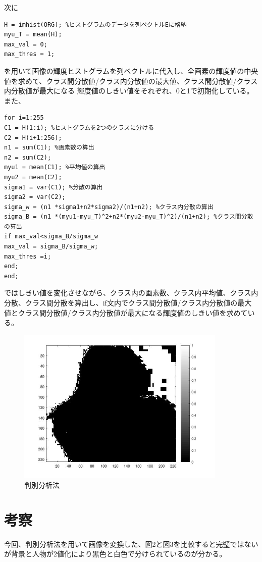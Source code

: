\documentclass{jsarticle}
\begin{document}
次に
\begin{lstlisting}[basicstyle=\ttfamily\footnotesize, frame=single]
H = imhist(ORG); %ヒストグラムのデータを列ベクトルEに格納
myu_T = mean(H);
max_val = 0;
max_thres = 1;
 \end{lstlisting}
を用いて画像の輝度ヒストグラムを列ベクトルに代入し、全画素の輝度値の中央値を求めて、クラス間分散値/クラス内分散値の最大値、クラス間分散値/クラス内分散値が最大になる
輝度値のしきい値をそれぞれ、0と1で初期化している。また、

\begin{lstlisting}[basicstyle=\ttfamily\footnotesize, frame=single]
for i=1:255
C1 = H(1:i); %ヒストグラムを2つのクラスに分ける
C2 = H(i+1:256);
n1 = sum(C1); %画素数の算出
n2 = sum(C2);
myu1 = mean(C1); %平均値の算出
myu2 = mean(C2);
sigma1 = var(C1); %分散の算出
sigma2 = var(C2);
sigma_w = (n1 *sigma1+n2*sigma2)/(n1+n2); %クラス内分散の算出
sigma_B = (n1 *(myu1-myu_T)^2+n2*(myu2-myu_T)^2)/(n1+n2); %クラス間分散の算出
if max_val<sigma_B/sigma_w
max_val = sigma_B/sigma_w;
max_thres =i;
end;
end;
 \end{lstlisting}
ではしきい値を変化させながら、クラス内の画素数、クラス内平均値、クラス内分散、クラス間分散を算出し、if文内でクラス間分散値/クラス内分散値の最大値とクラス間分散値/クラス内分散値が最大になる輝度値のしきい値を求めている。

\newpage
\begin{figure}[htbp]
 \begin{center}
  \includegraphics[width=10cm]{kadai5-1.jpg}
 \end{center}
 \caption{判別分析法}
\end{figure}

\section{考察}
今回、判別分析法を用いて画像を変換した、図2と図3を比較すると完璧ではないが背景と人物が2値化により黒色と白色で分けられているのが分かる。
\end{document}
